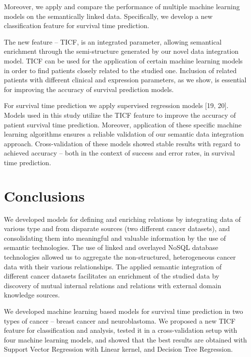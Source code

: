 \documentclass{bmcart}
\begin{document}
Moreover, we apply and compare the performance of multiple machine
learning models on the semantically linked data. Specifically, we
develop a new classification feature for survival time prediction. 

The new feature -- TICF, is an integrated parameter, allowing semantical
enrichment through the semi-structure generated by our novel data
integration model. TICF can be used for the application of certain
machine learning models in order to find patients closely related to
the studied one. Inclusion of related patients with different clinical
and expression parameters, as we show, is essential for improving the
accuracy of survival prediction models.

For survival time prediction we apply supervised regression models [19,
20]. Models used in this study utilize the TICF feature to improve the
accuracy of patient survival time prediction. Moreover, application of
these specific machine learning algorithms ensures a reliable
validation of our semantic data integration approach. Cross-validation
of these models showed stable results with regard to achieved accuracy
-- both in the context of success and error rates, in survival time
prediction.  

\section{Conclusions}

We developed models for defining and enriching relations by integrating
data of various type and from disparate sources (two different cancer
datasets), and consolidating them into meaningful and valuable
information by the use of semantic technologies. The use of linked and
overlayed NoSQL database technologies allowed us to aggregate the
non-structured, heterogeneous cancer data with their various
relationships. The applied semantic integration of different cancer
datasets facilitates an enrichment of the studied data by discovery of
mutual internal relations and relations with external domain knowledge
sources. 

We developed machine learning based models for survival time prediction
in two types of cancer {}-- breast cancer and neuroblastoma. We
proposed a new TICF feature for classification and analysis, tested it
in a cross-validation setup with four machine learning models, and
showed that the best results are obtained with Support Vector
Regression with Linear kernel, and Decision Tree Regression. 
\end{document}
